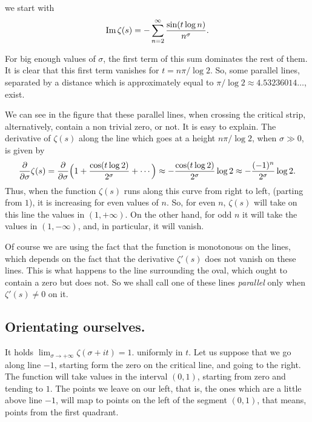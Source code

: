 \documentclass[a4paper]{amsart}
\numberwithin{equation}{section}
\def\sen{\operatorname{\text{sin}}}
\def\Im{\operatorname{\text{Im}}}
\begin{document}
\begin{large}




\noindent 
we start with 
$$\Im\zeta(s)=-\sum_{n=2}^{\infty}{\sen(t\log n)\over n^\sigma}.$$

For big enough values of $\sigma$, the first term of this sum dominates the
rest of them. It is clear that this first term vanishes for $t=n\pi/\log 2$.
So, some parallel lines, separated by a distance which is
approximately equal to $\pi/\log 2 \approx 4.53236014\dots$, exist.

We can see in the figure that these parallel lines, when crossing the critical
strip, alternatively, contain a non trivial zero, or not. It is easy to
explain. The derivative of $\zeta(s)$ along the line which goes at a height
$n\pi/\log 2$, when $\sigma \gg 0$, is given by
$${\partial\over\partial \sigma}\zeta(s)=
{\partial\over\partial \sigma}\Bigl(1+{\cos(t\log2)\over 
2^\sigma}+\cdots\Bigr)\approx -{\cos(t\log 2)\over2^\sigma}\log 
2\approx -{(-1)^n\over 2^\sigma}\log 2.$$
Thus, when the function $\zeta(s)$ runs along this curve from
right to left, (parting from $1$), it is increasing for even values
of $n$. So, for even $n$, $\zeta(s)$ will take on this line the
values in $(1, +\infty)$. On the other hand, for odd $n$ it will
take the values in $(1, -\infty)$, and, in particular, it will
vanish.

Of course we are using the fact that the function is monotonous on the lines,
which depends on the fact that the derivative $\zeta'(s)$ does not vanish on
these lines. This is what happens to the line surrounding the oval, which
ought to contain a zero but does not. So we shall call one of these lines 
{\em parallel}
only when  $\zeta'(s)\ne0$ on it.





\subsection{Orientating ourselves.} 
It holds $\lim_{\sigma\to+\infty}\zeta(\sigma+it)=1$.
 uniformly in $t$. Let us suppose
that we go along line $-1$, starting form the zero on the critical
line, and going to the right. The function will take values in the
interval $(0, 1)$, starting from zero and tending to $1$. The
points we leave on our left, that is, the ones which are a little
above line $-1$, will map to points on the left of the segment
$(0, 1)$, that means, points from the first quadrant.


\end{large}
\end{document}
